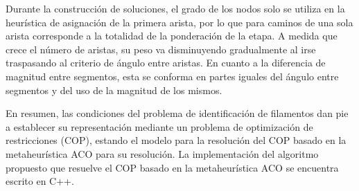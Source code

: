 Durante la construcci\'on de soluciones, el grado de los nodos solo se utiliza en la heur\'istica de asignaci\'on de la primera arista, por lo que para caminos de una sola arista corresponde a la totalidad de la ponderaci\'on de la etapa. A medida que crece el n\'umero de aristas, su peso va disminuyendo gradualmente al irse traspasando al criterio de \'angulo entre aristas. En cuanto a la diferencia de magnitud entre segmentos, esta se conforma en partes iguales del \'angulo entre segmentos y del uso de la magnitud de los mismos.

\vspace{1cm}
En resumen, las condiciones del problema de identificaci\'on de filamentos dan pie a establecer su representaci\'on mediante un problema de optimizaci\'on de restricciones (COP), estando el modelo para la resoluci\'on del COP basado en la metaheur\'istica ACO para su resoluci\'on. La implementaci\'on del algoritmo propuesto que resuelve el COP basado en la metaheur\'istica ACO se encuentra escrito en C++.